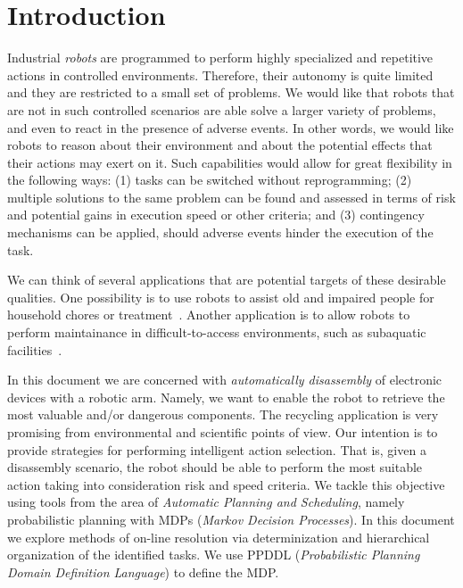 \documentclass[../root.tex]{subfiles}
\begin{document}
\section{Introduction}
\label{sec:introduction}

Industrial \emph{robots} are programmed to perform highly specialized and
repetitive actions in controlled environments. Therefore, their
autonomy is quite limited and they are restricted to a small set of
problems. We would like that robots that are
not in such controlled scenarios are able solve a larger variety of
problems, and even to react in the presence
of adverse events.
In other words, we
would like robots to reason about their environment and about the
potential effects that their actions may exert on it.
Such capabilities would allow for great flexibility in the following
ways: (1) tasks can be switched without reprogramming; (2) multiple
solutions to the same problem can be found and assessed in terms
of risk and potential gains in execution speed or other criteria; and (3)
contingency mechanisms can be applied, should adverse events hinder
the execution of the task.

We can think of several applications that are potential targets
of these desirable qualities. One possibility is to use robots to assist old and
impaired people for household chores
or treatment~\cite{canal2018adapting,andriella2018deciding}. Another
application is to allow robots to perform maintainance in difficult-to-access
environments, such as subaquatic facilities~\cite{palomeras2016toward,ong2010planning}.

In this document we are concerned with \emph{automatically disassembly}
of electronic devices with a robotic arm. Namely, we want to enable the
robot to retrieve the most valuable and/or dangerous components.
The recycling application is very promising from environmental
and scientific points of view. Our intention is
to provide strategies for performing intelligent action selection.
That is, given a disassembly scenario, the robot should be able
to perform the most suitable action taking into consideration
risk and speed criteria. We tackle this objective using tools
from the area of \emph{Automatic Planning and Scheduling}, namely
probabilistic planning with MDPs (\emph{Markov Decision Processes}).
In this document we explore methods of on-line resolution via
determinization and hierarchical organization of the
identified tasks. We use PPDDL (\emph{Probabilistic Planning Domain
Definition Language}) to define the MDP.
\end{document}
